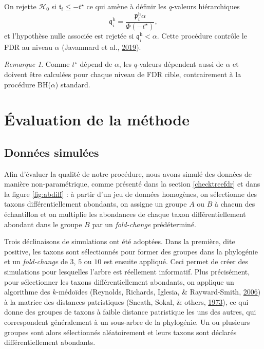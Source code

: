 \documentclass[12pt,a4paper]{reedthesis}
\newcommand \pv {\mathfrak{p}}
\newcommand \qv {\mathfrak{q}}
\newcommand \ts {\mathfrak{t}}
\theoremstyle{definition}
\theoremstyle{definition}
\theoremstyle{definition}
\theoremstyle{remark}
\newtheorem*{remark}{Remarque}
\begin{document}
On rejette \(\mathcal{H}_0\) si \(\ts_i \leq -t^{\star}\) ce qui amène à définir les \(q\)-valeurs hiérarchiques
\begin{equation*}
\qv^{\text{h}}_i = \frac{\pv^{\text{h}}_i \alpha}{\Phi(-t^{\star})},
\end{equation*}
et l'hypothèse nulle associée est rejetée si \(\qv^{\text{h}}_i < \alpha\). Cette procédure contrôle le FDR au niveau \(\alpha\) (Javanmard et al., \protect\hyperlink{ref-javanmard2019false}{2019}).
\begin{remark}
{}Comme \(t^{\star}\) dépend de \(\alpha\), les \(q\)-valeurs dépendent aussi de \(\alpha\) et doivent être calculées pour chaque niveau de FDR cible, contrairement à la procédure BH(\(\alpha\)) standard.
\end{remark}
\hypertarget{evaluation}{%
\section{Évaluation de la méthode}\label{evaluation}}

\hypertarget{simuzazou}{%
\subsection{Données simulées}\label{simuzazou}}

Afin d'évaluer la qualité de notre procédure, nous avons simulé des données de manière non-paramétrique, comme présenté dans la section \ref{checktreefdr} et dans la figure \ref{fig:abdiff} : à partir d'un jeu de données homogènes, on sélectionne des taxons différentiellement abondants, on assigne un groupe \(A\) ou \(B\) à chacun des échantillon et on multiplie les abondances de chaque taxon différentiellement abondant dans le groupe \(B\) par un \emph{fold-change} prédéterminé.

Trois déclinaisons de simulations ont été adoptées. Dans la première, dite positive, les taxons sont sélectionnés pour former des groupes dans la phylogénie et un \emph{fold-change} de \(3\), \(5\) ou \(10\) est ensuite appliqué. Ceci permet de créer des simulations pour lesquelles l'arbre est réellement informatif. Plus précisément, pour sélectionner les taxons différentiellement abondants, on applique un algorithme des \(k\)-médoïdes (Reynolds, Richards, Iglesia, \& Rayward-Smith, \protect\hyperlink{ref-reynolds2006clustering}{2006}) à la matrice des distances patristiques (Sneath, Sokal, \& others, \protect\hyperlink{ref-sneath1973numerical}{1973}), ce qui donne des groupes de taxons à faible distance patristique les uns des autres, qui correspondent généralement à un sous-arbre de la phylogénie. Un ou plusieurs groupes sont alors sélectionnés aléatoirement et leurs taxons sont déclarés différentiellement abondants.
\end{document}
